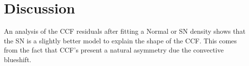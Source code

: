 \documentclass{aa}
\begin{document}


\section{Discussion} \label{sec:discu}

An analysis of the CCF residuals after fitting a Normal or SN density shows that the SN is a slightly better model to explain the shape of the CCF. This comes from the fact that CCF's present a natural asymmetry due the convective blueshift.
\end{document}
